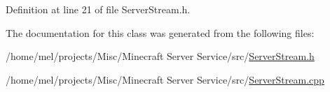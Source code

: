 Definition at line 21 of file Server\+Stream.\+h.



The documentation for this class was generated from the following files\+:\begin{DoxyCompactItemize}
\item 
/home/mel/projects/\+Misc/\+Minecraft Server Service/src/\hyperlink{_server_stream_8h}{Server\+Stream.\+h}\item 
/home/mel/projects/\+Misc/\+Minecraft Server Service/src/\hyperlink{_server_stream_8cpp}{Server\+Stream.\+cpp}\end{DoxyCompactItemize}
